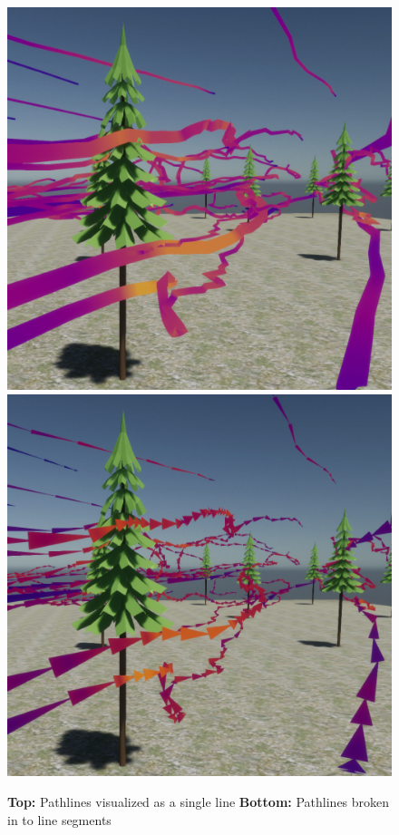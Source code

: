 \begin{figure}
\centering
\includegraphics[scale=.3]{Figures/TreePathline1.png}
\includegraphics[scale=.3]{Figures/TreePathline2.png}
\decoRule
\caption[Pathlines comparisons in Unity]{\textbf{Top:} Pathlines visualized as a single line  \textbf{Bottom:} Pathlines broken in to line segments }
\label{fig:UnityPathline}
\end{figure}
